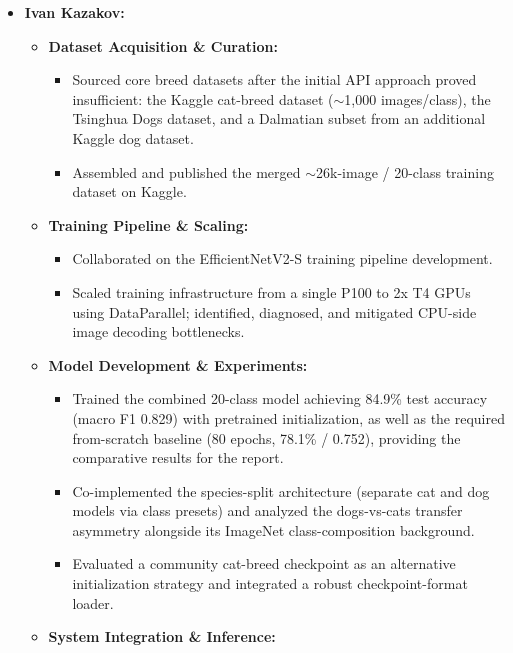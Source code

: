 \begin{itemize}
    \begin{itemize}
        \item \textbf{Ivan Kazakov:}
        \begin{itemize}
            \item \textbf{Dataset Acquisition \& Curation:}
            \begin{itemize}
                \item Sourced core breed datasets after the initial API approach proved insufficient: the Kaggle cat-breed dataset ($\sim$1,000 images/class), the Tsinghua Dogs dataset, and a Dalmatian subset from an additional Kaggle dog dataset.
                \item Assembled and published the merged $\sim$26k-image / 20-class training dataset on Kaggle.
            \end{itemize}
            \item \textbf{Training Pipeline \& Scaling:}
            \begin{itemize}
                \item Collaborated on the EfficientNetV2-S training pipeline development.
                \item Scaled training infrastructure from a single P100 to 2x T4 GPUs using DataParallel; identified, diagnosed, and mitigated CPU-side image decoding bottlenecks.
            \end{itemize}
            \item \textbf{Model Development \& Experiments:}
            \begin{itemize}
                \item Trained the combined 20-class model achieving 84.9\% test accuracy (macro F1 0.829) with pretrained initialization, as well as the required from-scratch baseline (80 epochs, 78.1\% / 0.752), providing the comparative results for the report.
                \item Co-implemented the species-split architecture (separate cat and dog models via class presets) and analyzed the dogs-vs-cats transfer asymmetry alongside its ImageNet class-composition background.
                \item Evaluated a community cat-breed checkpoint as an alternative initialization strategy and integrated a robust checkpoint-format loader.
            \end{itemize}
            \item \textbf{System Integration \& Inference:}
            \begin{itemize}

\end{itemize}
\end{itemize}
\end{itemize}
\end{itemize}
